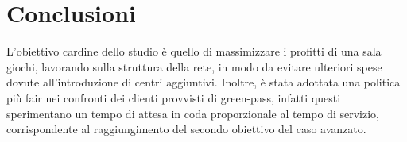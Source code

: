\documentclass{article}
\begin{document}
\section{Conclusioni}

L'obiettivo cardine dello studio è quello di massimizzare i profitti di una sala giochi, lavorando sulla struttura della rete, in modo da evitare ulteriori spese dovute all'introduzione di centri aggiuntivi. Inoltre, è stata adottata una politica più fair nei confronti dei clienti provvisti di green-pass, infatti questi sperimentano un tempo di attesa in coda proporzionale al tempo di servizio, corrispondente al raggiungimento del secondo obiettivo del caso avanzato. 
 
\end{document}

